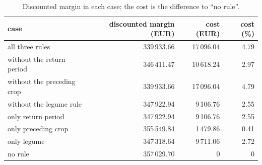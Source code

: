 \begin{table}[!ht]
\centering\footnotesize
\begin{tabular}{lrrr}
\toprule
case & discounted margin (EUR) & cost (EUR) & cost (\%)\\
\midrule
all three rules & 339\,933.66 & 17\,096.04 & 4.79\\
without the return period & 346\,411.47 & 10\,618.24 & 2.97\\
without the preceding crop & 339\,933.66 & 17\,096.04 & 4.79\\
without the legume rule & 347\,922.94 & 9\,106.76 & 2.55\\
only return period & 347\,922.94 & 9\,106.76 & 2.55\\
only preceding crop & 355\,549.84 & 1\,479.86 & 0.41\\
only legume & 347\,318.64 & 9\,711.06 & 2.72\\
no rule & 357\,029.70 & 0 & 0\\
\bottomrule
\end{tabular}
\caption{Discounted margin in each case; the cost is the difference to ``no rule''.}
\end{table}
